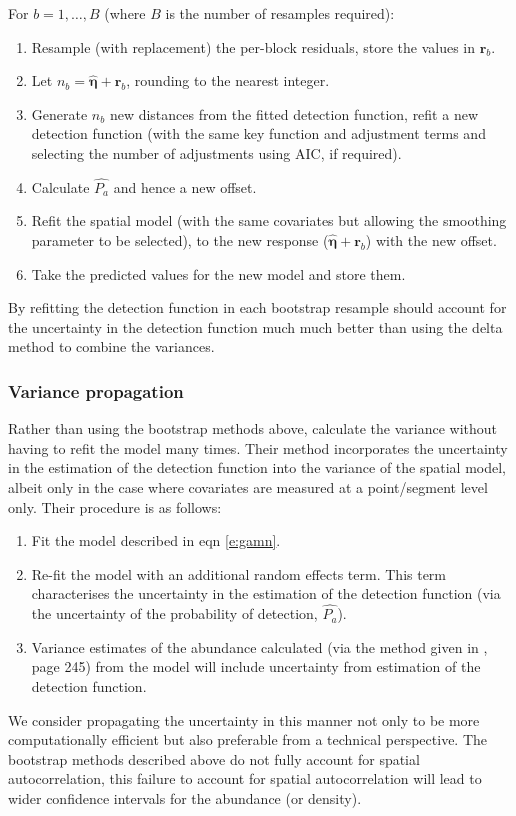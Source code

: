 \documentclass[a4paper,12pt]{article}
\begin{document}
For $b=1,\ldots,B$ (where $B$ is the number of resamples required):
\begin{enumerate}
	\item Resample (with replacement) the per-block residuals, store the values in $\mathbf{r}_{b}$.
	\item Let $n_b=\hat{\bm{\eta}}+\mathbf{r}_{b}$, rounding to the nearest integer.
	\item Generate $n_b$ new distances from the fitted detection function, refit a new detection function (with the same key function and adjustment terms and selecting the number of adjustments using AIC, if required).
	\item Calculate $\hat{P_a}$ and hence a new offset.
	\item Refit the spatial model (with the same covariates but allowing the smoothing parameter to be selected), to the new response ($\hat{\bm{\eta}}+\mathbf{r}_{b}$) with the new offset.
	\item Take the predicted values for the new model and store them.
\end{enumerate}

By refitting the detection function in each bootstrap resample should account for the uncertainty in the detection function much much better than using the delta method to combine the variances.

\subsubsection*{Variance propagation}

Rather than using the bootstrap methods above, \cite{WILLIAMS:2011in} calculate the variance without having to refit the model many times.  Their method incorporates the uncertainty in the estimation of the detection function into the variance of the spatial model, albeit only in the case where covariates are measured at a point/segment level only. Their procedure is as follows:
\begin{enumerate}
\item Fit the model described in eqn \ref{e:gamn}.
\item Re-fit the model with an additional random effects term. This term characterises the uncertainty in the estimation of the detection function (via the uncertainty of the probability of detection, $\hat{P_a}$).
\item Variance estimates of the abundance calculated (via the method given in \cite{Wood:2006wz}, page 245) from the model will include uncertainty from estimation of the detection function.
\end{enumerate}
We consider propagating the uncertainty in this manner not only to be more computationally efficient but also preferable from a technical perspective. The bootstrap methods described above do not fully account for spatial autocorrelation, this failure to account for spatial autocorrelation will lead to wider confidence intervals for the abundance (or density).
\end{document}
